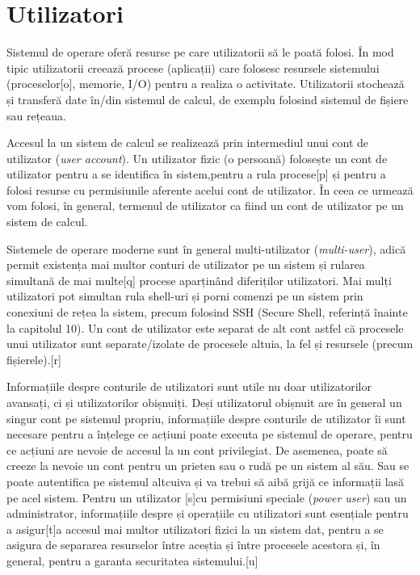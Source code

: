 \chapter{Utilizatori}
\label{chapter:users}

Sistemul de operare oferă resurse pe care utilizatorii să le poată folosi. În
mod tipic utilizatorii creează procese (aplicații) care folosesc resursele
sistemului (proceselor[o], memorie, I/O) pentru a realiza o activitate.
Utilizatorii stochează și transferă date în/din sistemul de calcul, de exemplu
folosind sistemul de fișiere sau rețeaua.

Accesul la un sistem de calcul se realizează prin intermediul unui cont de
utilizator (\textit{user account}). Un utilizator fizic (o persoană) folosește
un cont de utilizator pentru a se identifica în sistem,pentru a rula procese[p]
și pentru a folosi resurse cu permisiunile aferente acelui cont de utilizator.
În ceea ce urmează vom folosi, în general, termenul de utilizator ca fiind un
cont de utilizator pe un sistem de calcul.

Sistemele de operare moderne sunt în general multi-utilizator
(\textit{multi-user}), adică permit existența mai multor conturi de utilizator
pe un sistem și rularea simultană de mai multe[q] procese aparținând diferiților
utilizatori. Mai mulți utilizatori pot simultan rula shell-uri și porni comenzi
pe un sistem prin conexiuni de rețea la sistem, precum folosind SSH
 (Secure Shell, referință înainte la capitolul 10). Un
cont de utilizator este separat de alt cont astfel că procesele unui utilizator
sunt separate/izolate de procesele altuia, la fel și resursele (precum
fișierele).[r]

Informațiile despre conturile de utilizatori sunt utile nu doar utilizatorilor
avansați, ci și utilizatorilor obișnuiți. Deși utilizatorul obișnuit are în
general un singur cont pe sistemul propriu, informațiile despre conturile de
utilizator îi sunt necesare pentru a înțelege ce acțiuni poate executa pe
sistemul de operare, pentru ce acțiuni are nevoie de accesul la un cont
privilegiat. De asemenea, poate să creeze la nevoie un cont pentru un prieten
sau o rudă pe un sistem al său. Sau se poate autentifica pe sistemul altcuiva și
va trebui să aibă grijă ce informații lasă pe acel sistem. Pentru un utilizator
[s]cu permisiuni speciale (\textit{power user}) sau un administrator,
informațiile despre și operațiile cu utilizatori sunt esențiale pentru a
asigur[t]a accesul mai multor utilizatori fizici la un sistem dat, pentru a se
asigura de separarea resurselor între aceștia și între procesele acestora și, în
general, pentru a garanta securitatea sistemului.[u]

